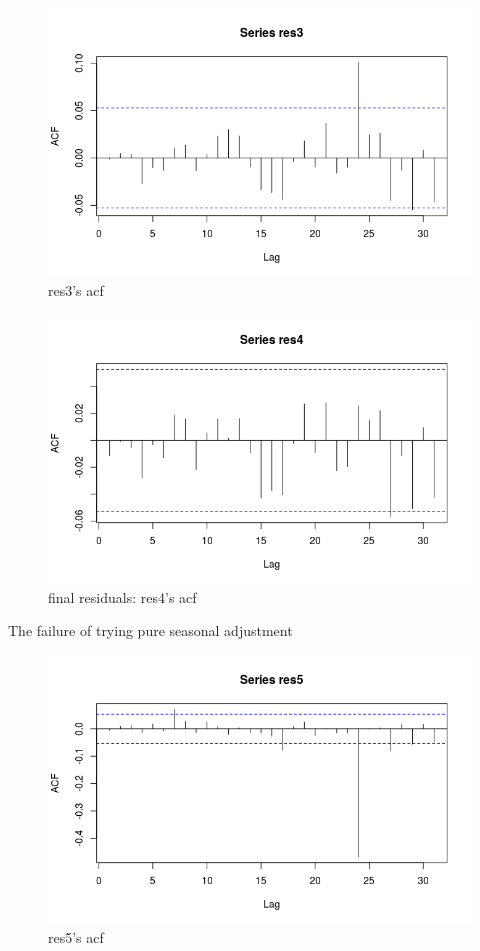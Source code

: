 \documentclass[a4paper,10pt]{article}
\begin{document}
\begin{figure}[H]
\centering
\caption{res3's acf}
\includegraphics[scale=.70]{res3_acf.png}
\end{figure}



\begin{figure}[H]
\centering
\caption{final residuals: res4's acf}
\includegraphics[scale=.70]{final_residuals_acf.png}
\end{figure}

The failure of trying pure seasonal adjustment

\begin{figure}[H]
\centering
\caption{res5's acf}
\includegraphics[scale=.70]{res5_acf.png}
\end{figure}
\end{document}
